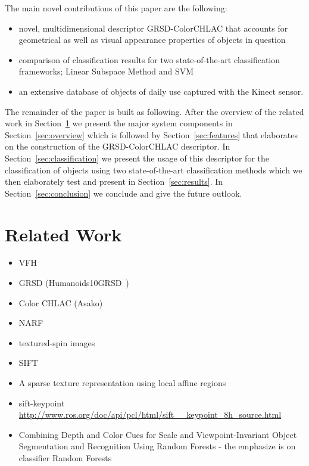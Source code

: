 \documentclass[conference]{sty/IEEEtran}
\begin{document}
The main novel contributions of this paper are the following:
\begin{itemize}
\item novel, multidimensional descriptor GRSD-ColorCHLAC that accounts for
geometrical as well as visual appearance  properties of objects in question
\item comparison of classification results for two state-of-the-art classification
frameworks; Linear Subspace Method and SVM
\item an extensive database of objects of daily use captured with the Kinect sensor.
\end{itemize}

The remainder of the paper is built as following. After the overview of the related
work in Section~\ref{sec:rl} we present the major system components in Section~\ref{sec:overview}
which is followed by Section~\ref{sec:features} that elaborates on the construction of the
GRSD-ColorCHLAC descriptor. In Section~\ref{sec:classification} we present the usage of this descriptor
for the classification of objects using two state-of-the-art classification methods which we
then elaborately test and present in Section~\ref{sec:results}. In Section~\ref{sec:conclusion}
we conclude and give the future outlook.

\section{Related Work}
\label{sec:rl}
\begin{itemize}
\item VFH~\cite{vfh}
\item GRSD (Humanoids10GRSD~)\cite{GRSD10Humanoids}
\item Color CHLAC (Asako)~\cite{kanezaki2010icra}\cite{kanezaki2010tvc}
\item NARF~\cite{steder10irosws}
\item textured-spin images~\cite{Johnson_spin_images}
\item SIFT~\cite{lowe04distinctive}
\item A sparse texture representation using local affine regions~\cite{Lazebnik05asparse}
\item sift-keypoint \url{http://www.ros.org/doc/api/pcl/html/sift__keypoint_8h_source.html}
\item Combining Depth and Color Cues for Scale and Viewpoint-Invariant
Object Segmentation and Recognition Using Random Forests - the emphasize is on classifier Random Forests~\cite{stueckler10combining}
\end{itemize}
\end{document}
